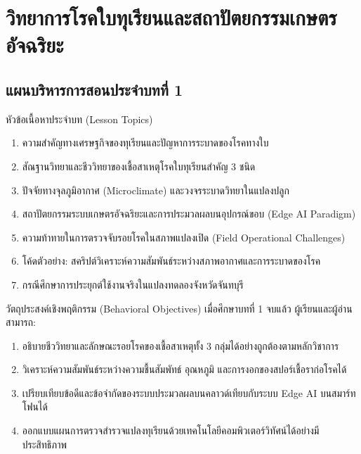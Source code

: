 \chapter{วิทยาการโรคใบทุเรียนและสถาปัตยกรรมเกษตรอัจฉริยะ}
\label{chap:durian_pathology_ai}

\section*{แผนบริหารการสอนประจำบทที่ 1}

\begin{planbox}{หัวข้อเนื้อหาประจำบท (Lesson Topics)}
\begin{enumerate}[leftmargin=1.5em, itemsep=2pt]
    \item ความสำคัญทางเศรษฐกิจของทุเรียนและปัญหาการระบาดของโรคทางใบ
    \item สัณฐานวิทยาและชีววิทยาของเชื้อสาเหตุโรคใบทุเรียนสำคัญ 3 ชนิด
    \item ปัจจัยทางจุลภูมิอากาศ (Microclimate) และวงจรระบาดวิทยาในแปลงปลูก
    \item สถาปัตยกรรมระบบเกษตรอัจฉริยะและการประมวลผลบนอุปกรณ์ขอบ (Edge AI Paradigm)
    \item ความท้าทายในการตรวจจับรอยโรคในสภาพแปลงเปิด (Field Operational Challenges)
    \item โค้ดตัวอย่าง: สคริปต์วิเคราะห์ความสัมพันธ์ระหว่างสภาพอากาศและการระบาดของโรค
    \item กรณีศึกษาการประยุกต์ใช้งานจริงในแปลงทดลองจังหวัดจันทบุรี
\end{enumerate}
\end{planbox}

\begin{planbox}{วัตถุประสงค์เชิงพฤติกรรม (Behavioral Objectives)}
เมื่อศึกษาบทที่ 1 จบแล้ว ผู้เรียนและผู้อ่านสามารถ:
\begin{enumerate}[leftmargin=1.5em, itemsep=2pt]
    \item อธิบายชีววิทยาและลักษณะรอยโรคของเชื้อสาเหตุทั้ง 3 กลุ่มได้อย่างถูกต้องตามหลักวิชาการ
    \item วิเคราะห์ความสัมพันธ์ระหว่างความชื้นสัมพัทธ์ อุณหภูมิ และการงอกของสปอร์เชื้อราก่อโรคได้
    \item เปรียบเทียบข้อดีและข้อจำกัดของระบบประมวลผลบนคลาวด์เทียบกับระบบ Edge AI บนสมาร์ทโฟนได้
    \item ออกแบบแผนการตรวจสำรวจแปลงทุเรียนด้วยเทคโนโลยีคอมพิวเตอร์วิทัศน์ได้อย่างมีประสิทธิภาพ
\end{enumerate}
\end{planbox}

